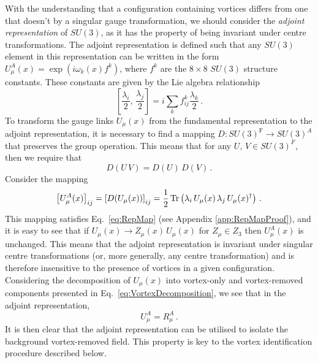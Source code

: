 With the understanding that a configuration containing vortices differs from one that doesn't by a singular gauge transformation, we should consider the \textit{adjoint representation} of $SU(3)$, as it has the property of being invariant under centre transformations. The adjoint representation is defined such that any $SU(3)$ element in this representation can be written in the form $U^A_\mu(x) = \exp\left(i \omega_k(x) f^k\right)$, where $f^k$ are the $8\times 8$ $SU(3)$ structure constants. These constants are given by the Lie algebra relationship
%
\begin{equation}
\left[\frac{\lambda_i}{2},\,\frac{\lambda_j}{2}\right] = i\sum_k f_{ij}^{k}\frac{\lambda_k}{2}\, .
\end{equation}
%
To transform the gauge links $U_\mu(x)$ from the fundamental representation to the adjoint representation, it is necessary to find a mapping $D:SU(3)^\text{F}\rightarrow SU(3)^A$ that preserves the group operation. This means that for any $U,\,V \in SU(3)^F$, then we require that
%
\begin{equation}
D(U\,V) = D(U)\,D(V)\, .
\label{eq:RepMap}
\end{equation}
%
Consider the mapping
%
\begin{equation}
\left[U_\mu^A(x)\right]_{ij} = \left[D(U_\mu(x))\right]_{ij} = \frac{1}{2}\operatorname{Tr}\left(\lambda_i \, U_\mu(x) \, \lambda_j\, U_\mu(x)^\dagger\right)\, .
\label{eq:AdjointRep}
\end{equation}
%
This mapping satisfies Eq.~\ref{eq:RepMap} (see Appendix \ref{app:RepMapProof}), and it is easy to see that if $U_\mu(x)\rightarrow Z_\mu(x)\, U_\mu(x)$ for $Z_\mu\in Z_3$ then $U^A_\mu(x)$ is unchanged. This means that the adjoint representation is invariant under singular centre transformations (or, more generally, any centre transformation) and is therefore insensitive to the presence of vortices in a given configuration. Considering the decomposition of $U_\mu(x)$ into vortex-only and vortex-removed components presented in Eq.~\ref{eq:VortexDecomposition}, we see that in the adjoint representation, 
%
\begin{equation}
U_\mu^A = R_\mu^A\, .
\end{equation}
%
It is then clear that the adjoint representation can be utilised to isolate the background vortex-removed field. This property is key to the vortex identification procedure described below.
 
